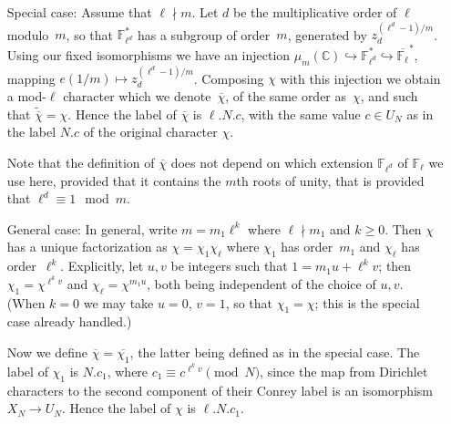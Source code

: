 \documentclass[a4paper, 10pt]{amsart}
\def\C{{\mathbb C}}
\def\Fl{{\mathbb F}_{\ell}}
\def\Fld{{\mathbb F}_{\ell^d}}
\def\Flbar{\overline{{\mathbb F}_{\ell}}}
\newcommand{\CLab}[2]{$#1.#2$}
\newcommand{\DLab}[3]{$#1.#2.#3$}   %
\begin{document}
\begin{itemize}
  \item[Special case:] Assume that $\ell\nmid m$. Let $d$ be the
    multiplicative order of $\ell$ modulo~$m$, so that $\Fld^*$ has a
    subgroup of order~$m$, generated by $z_d^{(\ell^d-1)/m}$.  Using
    our fixed isomorphisms we have an injection
    $\mu_m(\C)\hookrightarrow\Fld^*\hookrightarrow\Flbar^*$, mapping
    $e(1/m)\mapsto z_d^{(\ell^d-1)/m}$.  Composing $\chi$ with this
    injection we obtain a mod-$\ell$ character which we
    denote~$\overline{\chi}$, of the same order as~$\chi$, and such
    that $\tilde{\overline{\chi}}=\chi$.  Hence the label of
    $\overline{\chi}$ is \DLab{\ell}{N}{c}, with the same value
    $c\in U_N$ as in the label \CLab{N}{c} of the original character
    $\chi$.

    Note that the definition of $\overline{\chi}$ does not depend on
    which extension $\Fld$ of $\Fl$ we use here, provided that it
    contains the $m$th roots of unity, that is provided that
    $\ell^d\equiv1\mod{m}$.

    \item[General case:] In general, write $m=m_1\ell^k$ where
      $\ell\nmid m_1$ and $k\ge0$.  Then $\chi$ has a unique
      factorization as $\chi=\chi_1\chi_{\ell}$ where $\chi_1$ has
      order~$m_1$ and $\chi_{\ell}$ has order~$\ell^k$.  Explicitly,
      let $u,v$ be integers such that $1=m_1u+\ell^kv$; then
      $\chi_1=\chi^{\ell^kv}$ and $\chi_{\ell}=\chi^{m_1u}$, both
      being independent of the choice of $u,v$.  (When $k=0$ we may
      take $u=0$, $v=1$, so that $\chi_1=\chi$; this is the special
      case already handled.)

      Now we define $\overline{\chi}=\overline{\chi_1}$, the latter
      being defined as in the special case.  The label of $\chi_1$ is
      \CLab{N}{c_1}, where $c_1\equiv c^{\ell^kv}\pmod{N}$, since the
      map from Dirichlet characters to the second component of their
      Conrey label is an isomorphism $X_N\to U_N$.  Hence the label
      of $\chi$ is \DLab{\ell}{N}{c_1}.
\end{itemize}
\end{document}
